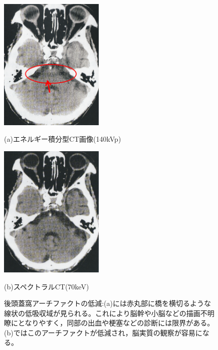 \begin{figure}[H]
 \begin{minipage}{0.52\hsize}
  \begin{center}
   \includegraphics[width=5cm]{image/other/artifact_1.eps}
  \end{center}
  \vspace{-0.5cm}\hspace{1cm}
   (a)エネルギー積分型CT画像(140kVp)
 \end{minipage}
   \begin{minipage}{0.5\hsize}
  \begin{center}
   \includegraphics[width=5cm]{image/other/artifact_1_after.eps}
  \end{center}
  \vspace{-0.5cm}\hspace{2cm}
   (b)スペクトラルCT(70keV)
 \end{minipage}
 \begin{center}
  \vspace{-1zh}
  \caption{後頭蓋窩アーチファクトの低減\cite{spectralCT}:(a)には赤丸部に橋を横切るような線状の低吸収域が見られる。これにより脳幹や小脳などの描画不明瞭にとなりやすく，同部の出血や梗塞などの診断には限界がある。(b)ではこのアーチファクトが低減され，脳実質の観察が容易になる。}
  \label{fig:artifact_1}
  \end{center}
\end{figure}


